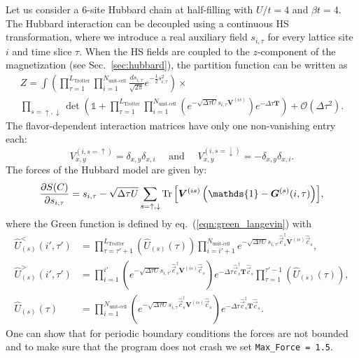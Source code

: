 Let us consider a 6-site Hubbard chain at half-filling with $U/t = 4$ and  $\beta t = 4$.
The Hubbard interaction can be decoupled using a continuous HS transformation, where we introduce a real auxiliary field $s_{i,\tau}$ for every lattice site $i$ and time slice $\tau$. When the HS fields are coupled to the $z$-component of the magnetization (see Sec.~\ref{sec:hubbard}), the partition function can be written as
\begin{multline}
Z = \int \left( \prod_{\tau=1}^{L_{\text{Trotter}}} \prod_{i=1}^{N_{\text{unit-cell}} } \frac{d s_{i,\tau}}{\sqrt{2 \pi}} e^{-\frac{1}{2} s_{i,\tau}^2 } \right) \times \\
\prod_{s=\uparrow, \downarrow} \det \left(  \mathds{1} + \prod_{\tau=1}^{L_{\mathrm{Trotter}}}    \prod_{i=1}^{N_{\text{unit-cell}}} \left( e^{-\sqrt{\Delta \tau U}s_{i,\tau} \bm{V}^{(is)}} \right) e^{-\Delta \tau \bm{T}} \right) + \mathcal{O}(\Delta\tau^{2}).
\end{multline}
The flavor-dependent interaction matrices have only one non-vanishing entry each: \begin{equation*}
V_{x,y}^{(i,s=\uparrow)}=\delta_{x,y}\delta_{x,i} \quad \text{ and } \quad V_{x,y}^{(i,s=\downarrow)}=-\delta_{x,y}\delta_{x,i}.
\end{equation*} 
The forces of the Hubbard model are given by:
\begin{equation}
\frac { \partial S(C)}{\partial s_{i,\tau} } = s_{i,\tau} - \sqrt{\Delta \tau U} \sum\limits_{s=\uparrow, \downarrow} \Tr{\left[ \bm{V}^{(is)}\left(\mathds{1} - \bm{G}^{(s)}(i,\tau) \right) \right]} ,
\end{equation}
where the Green function is defined by eq.~(\ref{eqn:green_langevin}) with
\begin{align}
 \hat{U}_{(s)}^{<}(i',\tau') &= \prod_{\tau=\tau'+1}^{L_{\text{Trotter}}}  \left( \hat{U}_{(s)}(\tau) \right)
\prod_{i=i'+1}^{N_{\text{unit-cell}} } e^{-\sqrt{\Delta\tau U}  s_{i,\tau'} \hat{\vec{c}}_{s}^{\dagger} \bm{V}^{(is)} \hat{\vec{c}}_{s}^{\phantom\dagger}}, \\
 \hat{U}_{(s)}^{>}(i',\tau') &= \prod_{i=1}^{i'}\left( e^{-\sqrt{\Delta\tau U}  s_{i,\tau'} \hat{\vec{c}}_{s}^{\dagger} \bm{V}^{(is)} \hat{\vec{c}}_{s}^{\phantom\dagger}} \right)
    e^{-\Delta\tau  \hat{\vec{c}}_{s}^{\dagger} \bm{T} \hat{\vec{c}}_{s}^{\phantom\dagger}} 
  \prod_{\tau=1}^{\tau'-1}  \left( \hat{U}_{(s)}(\tau) \right), \\
  \hat{U}_{(s)}(\tau) &=  \prod_{i=1}^{N_{\text{unit-cell}} } \left(e^{-\sqrt{\Delta\tau U}  s_{i,\tau} \hat{\vec{c}}_{s}^{\dagger} \bm{V}^{(is)} \hat{\vec{c}}_{s}^{\phantom\dagger}} \right)
   e^{-\Delta\tau  \hat{\vec{c}}_{s}^{\dagger} \bm{T} \hat{\vec{c}}_{s}^{\phantom\dagger}} .
\end{align}
One can show that for periodic boundary conditions the   forces are not bounded 
and to make sure that the program does not crash we set \texttt{Max\_Force = 1.5}.\\

